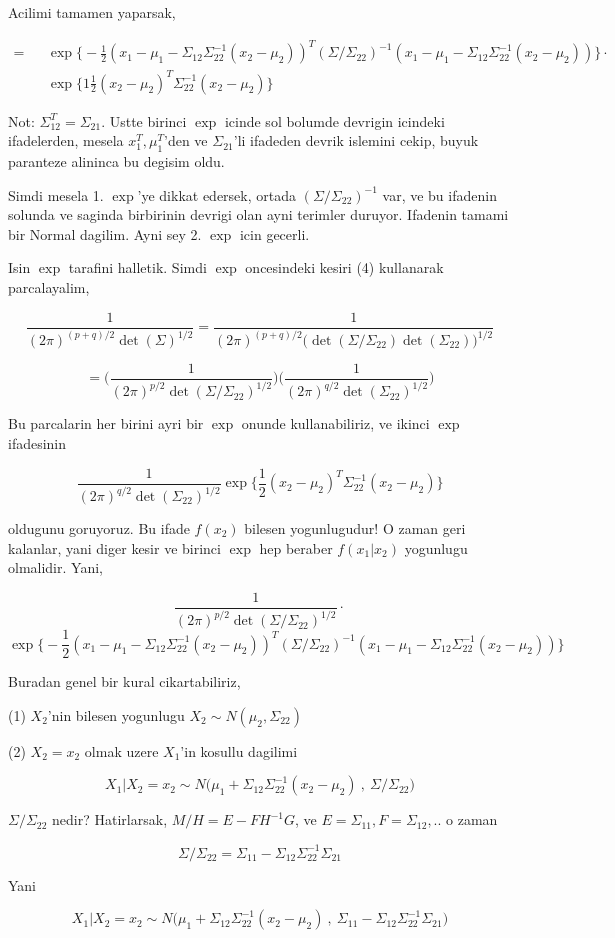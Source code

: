 \documentclass[12pt,fleqn]{article}\usepackage{../common}
\begin{document}
Acilimi tamamen yaparsak, 

\[ 
 \begin{array}{lll}
= && \exp \bigg\{
-\frac{1 }{2} 
(x_1 - \mu_1 - \Sigma_{12}\Sigma_{22}^{-1} (x_2 - \mu_2))^T 
(\Sigma/\Sigma_{22})^{-1} 
(x_1 - \mu_1 - \Sigma_{12}\Sigma_{22}^{-1} (x_2 - \mu_2))
\bigg\} \cdot \\
&& \exp \bigg\{
1\frac{ 1}{2}(x_2-\mu_2)^T\Sigma_{22}^{-1} (x_2-\mu_2)
 \bigg\}
\end{array}
 \]

Not: $\Sigma_{12}^T = \Sigma_{21}$. Ustte birinci $\exp$ icinde sol bolumde devrigin icindeki ifadelerden,  
mesela $x_1^T,\mu_1^T$'den ve $\Sigma_{21}$'li ifadeden devrik islemini cekip, buyuk paranteze 
alininca bu degisim oldu. 

Simdi mesela 1. $\exp$'ye dikkat edersek, ortada $(\Sigma/\Sigma_{22})^{-1} $ var, ve bu ifadenin solunda ve saginda 
birbirinin devrigi olan ayni terimler duruyor. Ifadenin tamami bir Normal
dagilim. Ayni sey 2. $\exp$ icin gecerli. 

Isin $\exp$ tarafini halletik. Simdi $\exp$ oncesindeki kesiri (4) kullanarak
parcalayalim, 

\[ 
\frac{ 1}{(2\pi)^{(p+q)/2} \det(\Sigma)^{1/2}}  = 
\frac{ 1}{(2\pi)^{(p+q)/2} \bigg(\det(\Sigma/\Sigma_{22})\det(\Sigma_{22})\bigg)^{1/2}} 
 \]

\[ =
\bigg( \frac{ 1}{(2\pi)^{p/2} \det(\Sigma/\Sigma_{22})^{1/2}} \bigg)
\bigg( \frac{ 1}{(2\pi)^{q/2} \det(\Sigma_{22})^{1/2}} \bigg)
 \]

Bu parcalarin her birini ayri bir $\exp$ onunde kullanabiliriz, ve ikinci $\exp$
ifadesinin 

\[ 
\frac{ 1}{(2\pi)^{q/2} \det(\Sigma_{22})^{1/2}}
\exp \bigg\{
\frac{ 1}{2}(x_2-\mu_2)^T\Sigma_{22}^{-1} (x_2-\mu_2)
 \bigg\}
 \]


oldugunu goruyoruz. Bu ifade $f(x_2)$ bilesen yogunlugudur! O zaman geri
kalanlar, yani diger kesir ve birinci $\exp$ hep beraber $f(x_1|x_2)$
yogunlugu olmalidir. Yani,

\[ 
\frac{ 1}{(2\pi)^{p/2} \det(\Sigma/\Sigma_{22})^{1/2}} \cdot
 \]
\[ 
\exp \bigg\{
-\frac{1 }{2} 
(x_1 - \mu_1 - \Sigma_{12}\Sigma_{22}^{-1} (x_2 - \mu_2))^T 
(\Sigma/\Sigma_{22})^{-1} 
(x_1 - \mu_1 - \Sigma_{12}\Sigma_{22}^{-1} (x_2 - \mu_2))
\bigg\}
 \]

Buradan genel bir kural cikartabiliriz, 

(1) $X_2$'nin bilesen yogunlugu $X_2 \sim N(\mu_2, \Sigma_{22})$

(2) $X_2 = x_2$ olmak uzere $X_1$'in kosullu dagilimi 

\[ X_1 | X_2 = x_2 \sim 
N\bigg(\mu_1 + \Sigma_{12}\Sigma_{22}^{-1} (x_2 -\mu_2) \ , \
\Sigma/\Sigma_{22} \bigg)
 \]

$\Sigma/\Sigma_{22}$ nedir? Hatirlarsak, $M/H = E-FH^{-1}G$, ve 
$E = \Sigma_{11},F=\Sigma_{12},..$ o zaman 

\[ \Sigma/\Sigma_{22} = \Sigma_{11}-\Sigma_{12} \Sigma_{22}^{-1} \Sigma_{21} \]

Yani

\[ X_1 | X_2 = x_2 \sim 
N\bigg(\mu_1 + \Sigma_{12}\Sigma_{22}^{-1} (x_2 -\mu_2) \ , \
\Sigma_{11}-\Sigma_{12} \Sigma_{22}^{-1} \Sigma_{21}
\bigg)
 \]
\end{document}
